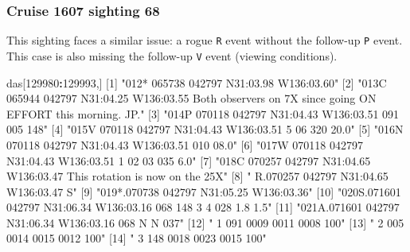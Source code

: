 \documentclass[
]{book}
\newenvironment{Shaded}{\begin{snugshade}}{\end{snugshade}}
\newcommand{\DecValTok}[1]{\textcolor[rgb]{0.00,0.00,0.81}{#1}}
\newcommand{\NormalTok}[1]{#1}
\newcommand{\OperatorTok}[1]{\textcolor[rgb]{0.81,0.36,0.00}{\textbf{#1}}}
\newcommand{\StringTok}[1]{\textcolor[rgb]{0.31,0.60,0.02}{#1}}
\begin{document}
\hypertarget{cruise-1607-sighting-68}{%
\subsubsection*{Cruise 1607 sighting 68}\label{cruise-1607-sighting-68}}

This sighting faces a similar issue: a rogue \texttt{R} event without the follow-up \texttt{P} event. This case is also missing the follow-up \texttt{V} event (viewing conditions).

\begin{Shaded}
\begin{Highlighting}[]
\NormalTok{das[}\DecValTok{129980}\OperatorTok{:}\DecValTok{129993}\NormalTok{,] }
\NormalTok{ [}\DecValTok{1}\NormalTok{] }\StringTok{"012* 065738 042797 N31:03.98 W136:03.60"}                                                              
\NormalTok{ [}\DecValTok{2}\NormalTok{] }\StringTok{"013C 065944 042797 N31:04.25 W136:03.55 Both observers on 7X since going ON EFFORT this morning.  JP."}
\NormalTok{ [}\DecValTok{3}\NormalTok{] }\StringTok{"014P 070118 042797 N31:04.43 W136:03.51  091  005  148"}                                               
\NormalTok{ [}\DecValTok{4}\NormalTok{] }\StringTok{"015V 070118 042797 N31:04.43 W136:03.51    5   06  320      20.0"}                                     
\NormalTok{ [}\DecValTok{5}\NormalTok{] }\StringTok{"016N 070118 042797 N31:04.43 W136:03.51  010 08.0"}                                                    
\NormalTok{ [}\DecValTok{6}\NormalTok{] }\StringTok{"017W 070118 042797 N31:04.43 W136:03.51    1   02   03  035  6.0"}                                     
\NormalTok{ [}\DecValTok{7}\NormalTok{] }\StringTok{"018C 070257 042797 N31:04.65 W136:03.47 This rotation is now on the 25X"}                              
\NormalTok{ [}\DecValTok{8}\NormalTok{] }\StringTok{"   R.070257 042797 N31:04.65 W136:03.47    S"}                                                         
\NormalTok{ [}\DecValTok{9}\NormalTok{] }\StringTok{"019*.070738 042797 N31:05.25 W136:03.36"}                                                              
\NormalTok{[}\DecValTok{10}\NormalTok{] }\StringTok{"020S.071601 042797 N31:06.34 W136:03.16  068  148    3    4  028  1.8  1.5"}                           
\NormalTok{[}\DecValTok{11}\NormalTok{] }\StringTok{"021A.071601 042797 N31:06.34 W136:03.16  068         N    N  037"}                                     
\NormalTok{[}\DecValTok{12}\NormalTok{] }\StringTok{"   1                                     091 0009 0011 0008  100"}                                     
\NormalTok{[}\DecValTok{13}\NormalTok{] }\StringTok{"   2                                     005 0014 0015 0012  100"}                                     
\NormalTok{[}\DecValTok{14}\NormalTok{] }\StringTok{"   3                                     148 0018 0023 0015  100"}                                     
\end{Highlighting}
\end{Shaded}
\end{document}
